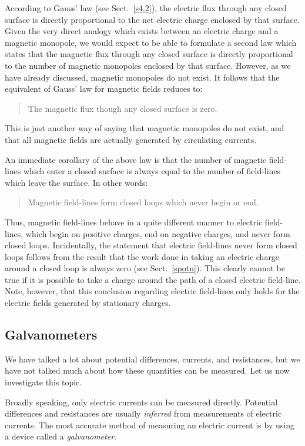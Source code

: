 According to Gauss' law (see Sect.~\ref{s4.2}), the electric flux 
through any  closed surface is directly
proportional to the net electric charge enclosed by that surface.
Given the very direct analogy which exists between an electric charge and a magnetic
monopole, we would expect to be able to formulate a second law which
states that the magnetic flux through any closed surface is directly
proportional to the number of magnetic monopoles enclosed by that surface.
However, as we have already discussed,  magnetic monopoles do not exist. It follows that the equivalent of Gauss' law
for magnetic fields reduces to:
\begin{quote}
{\sf The magnetic flux though any closed surface is zero.}
\end{quote}
This is just another way of saying that magnetic monopoles do not exist, and
that all magnetic fields are actually  generated by circulating currents. 

An immediate corollary of the above law is that the number of magnetic
field-lines which enter a closed surface is always equal to the number of
field-lines which leave the surface. In other words:
\begin{quote}
{\sf Magnetic field-lines form closed loops which never begin or end.}
\end{quote}
Thus, magnetic field-lines behave in a quite different manner to electric
field-lines, which begin on positive charges, end on negative charges,
and never form closed loops. Incidentally,
the statement that electric field-lines never form closed
loops follows from  the result that the work done
in taking an electric charge around a closed loop is always zero (see Sect.~\ref{spotn}). This
clearly cannot be  true if it is possible to take a charge around the path of
a closed electric field-line. Note, however, that this conclusion regarding
electric field-lines only holds for the electric fields generated by stationary
charges. 

\subsection{Galvanometers}\label{s8.11}
We have talked a lot about potential differences, currents, and 
resistances, but we
have not talked much about how these quantities can be measured. Let us now
investigate this topic. 

Broadly speaking, only electric currents can be measured directly. Potential
differences  and
resistances are usually {\em inferred}\/ from measurements of electric currents.
The most accurate method of measuring an electric current is by using a
device called a {\em galvanometer}. 

